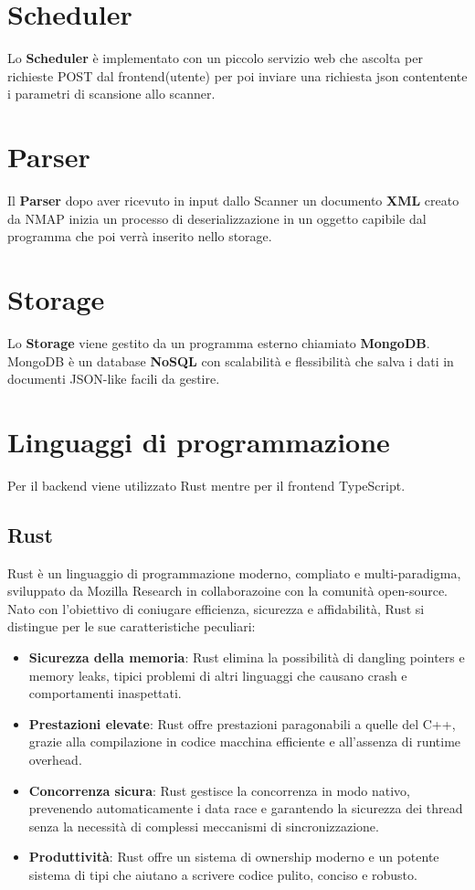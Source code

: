 \documentclass[target=bach,aauheader=,style=]{thud}
\begin{document}
\section{Scheduler}
Lo \textbf{Scheduler} è implementato con un piccolo servizio web che ascolta per richieste POST dal frontend(utente) per poi inviare una richiesta json contentente i parametri di scansione allo scanner.

\section{Parser}
Il \textbf{Parser} dopo aver ricevuto in input dallo Scanner un documento \textbf{XML} creato da NMAP inizia un processo di deserializzazione in un oggetto capibile dal programma che poi verrà inserito nello storage.

\section{Storage}
Lo \textbf{Storage} viene gestito da un programma esterno chiamiato \textbf{MongoDB}. 
MongoDB è un database \textbf{NoSQL} con scalabilità e flessibilità che salva i dati in documenti JSON-like facili da gestire.

\section{Linguaggi di programmazione}
Per il backend viene utilizzato Rust mentre per il frontend TypeScript. 
\subsection{Rust}
Rust è un linguaggio di programmazione moderno, compliato e multi-paradigma, sviluppato da Mozilla Research in collaborazoine con la comunità open-source. Nato con l'obiettivo di coniugare efficienza, sicurezza e affidabilità, Rust si distingue per le sue caratteristiche peculiari:
\begin{itemize}
  \item \textbf{Sicurezza della memoria}: Rust elimina la possibilità di dangling pointers e memory leaks, tipici problemi di altri linguaggi che causano crash e comportamenti inaspettati.
  \item \textbf{Prestazioni elevate}: Rust offre prestazioni paragonabili a quelle del C++, grazie alla compilazione in codice macchina efficiente e all'assenza di runtime overhead.
  \item \textbf{Concorrenza sicura}: Rust gestisce la concorrenza in modo nativo, prevenendo automaticamente i data race e garantendo la sicurezza dei thread senza la necessità di complessi meccanismi di sincronizzazione.
  \item \textbf{Produttività}: Rust offre un sistema di ownership moderno e un potente sistema di tipi che aiutano a scrivere codice pulito, conciso e robusto.
\end{itemize}
\end{document}
